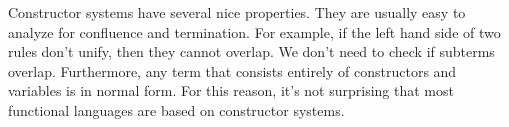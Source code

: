 \documentclass{book}
\theoremstyle{definition}
\begin{document}
Constructor systems have several nice properties.
They are usually easy to analyze for confluence and termination.
For example, if the left hand side of two rules don't unify, then they cannot overlap.
We don't need to check if subterms overlap.
Furthermore, any term that consists entirely of constructors and variables is in normal form.
For this reason, it's not surprising that most functional languages are based on constructor systems.

%
%
%
%
\end{document}
